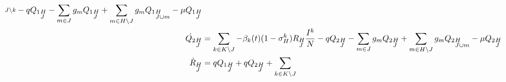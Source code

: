 \begin{footnotesize}
\begin{align}
{\begin{subarray}{l}
        J \setminus k \end{subarray}} -q {Q_1}_{\begin{subarray}{l}H \\ J
      \end{subarray}} -\sum_{m \in J } g_m {Q_1}_{\begin{subarray}{l}H \\
        J \end{subarray}} + \sum_{m \in H \setminus J} g_m
    {Q_1}_{\begin{subarray}{l}H \\ J \cup m \end{subarray}} -\mu
    {Q_1}_{\begin{subarray}{l}H \\ J \end{subarray}} \notag \\
    \dot{{Q_2}}_{\begin{subarray}{l}H\\ J \end{subarray}} &= \sum_{k
      \in K\setminus J} -\beta_k(t) (1 -\sigma^k_{H}) R_{\begin{subarray}{l}H\\
        J \end{subarray}} \frac{I^k}{N} -q {Q_2}_{\begin{subarray}{l}H \\
        J \end{subarray}} -\sum_{m \in J} g_m {Q_2}_{\begin{subarray}{l}H
        \\ J \end{subarray}} + \sum_{m \in H \setminus J} g_m
    {Q_2}_{\begin{subarray}{l}H \\ J \cup m \end{subarray}} -\mu
    {Q_2}_{\begin{subarray}{l}H \\ J \end{subarray}} \notag \\
    \dot{R}_{\begin{subarray}{l}H\\ J \end{subarray}} &= q
    {Q_{1}}_{\begin{subarray}{l}H \\ J \end{subarray}} +q
    {Q_2}_{\begin{subarray}{l}H \\ J \end{subarray}} +\sum_{k \in K\setminus J}

\end{align}
\end{footnotesize}
